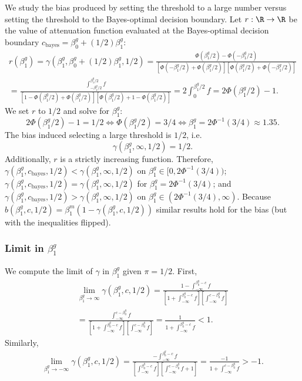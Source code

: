 \documentclass[12pt]{article}
\begin{document}
We study the bias produced by setting the threshold to a large number versus setting the threshold to the Bayes-optimal decision boundary. Let $r: \R \to \R$ be the value of attenuation function evaluated at the Bayes-optimal decision boundary $c_\textrm{bayes} = \beta^g_0 + (1/2) \beta^g_1$:
\begin{multline*}
r(\beta^g_1) = \gamma(\beta^g_1, \beta^g_0 + (1/2)\beta^g_1, 1/2) = \frac{\Phi(\beta^g_1/2) - \Phi(-\beta^g_1/2)}{\left[\Phi(-\beta^g_1/2) + \Phi( \beta^g_1/2) \right] \left[\Phi(\beta^g_1/2) + \Phi( -\beta^g_1/2)\right]} \\ = \frac{\int_{-\beta^g_1/2}^{\beta^g_1/2} f}{\left[ 1 - \Phi(\beta^g_1/2) + \Phi(\beta^g_1/2) \right]\left[ \Phi(\beta^g_1/2) + 1 - \Phi(\beta^g_1/2) \right]} = 2 \int_{0}^{\beta^g_1/2} f = 2 \Phi(\beta^g_1/2) - 1.
\end{multline*}
We set $r$ to $1/2$ and solve for $\beta^g_1$:
$$ 2\Phi(\beta^g_1/2) -1 = 1/2 \iff \Phi(\beta^g_1/2) = 3/4 \iff \beta^g_1 = 2 \Phi^{-1}(3/4) \approx 1.35.$$ The bias induced selecting a large threshold is $1/2$, i.e.
$$\gamma(\beta^g_1, \infty, 1/2) = 1/2.$$
Additionally, $r$ is a strictly increasing function. Therefore, $\gamma(\beta^g_1, c_\textrm{bayes},1/2) < \gamma(\beta^g_1, \infty, 1/2)$ on $\beta^g_1 \in [0, 2\Phi^{-1}(3/4))$; $\gamma(\beta^g_1, c_\textrm{bayes},1/2) = \gamma(\beta^g_1, \infty, 1/2)$ for $\beta^g_1 = 2\Phi^{-1}(3/4)$; and $\gamma(\beta^g_1, c_\textrm{bayes},1/2) > \gamma(\beta^g_1, \infty, 1/2)$ on $\beta^g_1 \in (2\Phi^{-1}(3/4), \infty)$. Because $b(\beta^g_1, c, 1/2) = \beta^m_1(1 - \gamma(\beta^g_1, c, 1/2))$ similar results hold for the bias (but with the inequalities flipped).

\subsubsection{Limit in $\beta^g_1$}
We compute the limit of $\gamma$ in $\beta^g_1$ given $\pi = 1/2$.  First,
\begin{multline*}
 \lim_{\beta^g_1 \to \infty} \gamma(\beta^g_1, c, 1/2) = \frac{ 1 - \int_{-\infty}^{\beta^g_0 - c} f}{\left[ 1 + \int_{-\infty}^{ \beta^g_0 - c} f \right] \left[\int_{-\infty}^{ c - \beta^g_0} f \right]} \\ = \frac{\int_{-\infty}^{c - \beta^g_0} f }{ \left[1 + \int_{-\infty}^{ \beta^g_0 - c} f \right] \left[\int_{-\infty}^{ c - \beta^g_0} f \right]} = \frac{1}{1 + \int_{-\infty}^{\beta^g_0 - c} f} < 1.
\end{multline*}
Similarly,
\begin{multline*}
\lim_{\beta^g_1 \to -\infty} \gamma(\beta^g_1, c, 1/2) = \frac{ -\int_{-\infty}^{\beta^g_0 - c} f }{\left[ \int_{-\infty}^{\beta^g_0 - c} f \right] \left[ \int_{-\infty}^{c - \beta^g_0} f + 1 \right]} = \frac{-1}{1 + \int_{-\infty}^{c - \beta^g_0} f} > -1.
\end{multline*}
\end{document}
